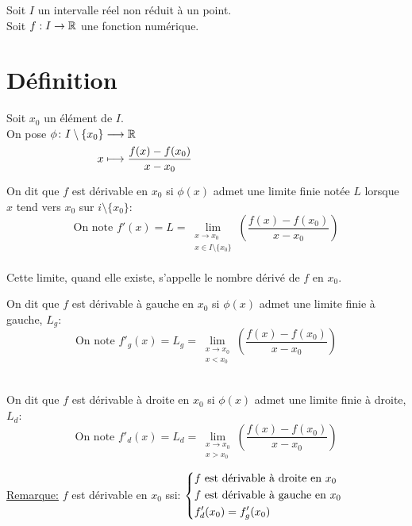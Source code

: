 \documentclass[12pt,twoside,a4paper]{article}
\author{MPSI 2}
\begin{document}
	\maketitle
	\begin{flushleft}
		Soit $I$ un intervalle r\'eel non r\'eduit \`a un point.\\
		Soit $f:I\rightarrow\mathbb{R}$ une fonction num\'erique.
	\end{flushleft}
	\section{D\'efinition}
		\begin{flushleft}
			Soit $x_0$ un \'el\'ement de $I$.\\
			On pose $\begin{aligned}[t]\phi\colon I\setminus\{x_0\}&\longrightarrow\mathbb{R} \\x&\longmapsto\frac{f(x)-f(x_0)}{x-x_0}\end{aligned}$
		\end{flushleft}
		\begin{defi}
			\begin{liste}
				\item On dit que $f$ est d\'erivable en $x_0$ si $\phi(x)$ admet une limite finie not\'ee $L$ lorsque $x$ tend vers $x_0$ sur $i\setminus\{x_0\}$:\\
					$$\text{On note }f'(x)=L=\lim\limits_{\substack{x\rightarrow x_0 \\x\in I\setminus\{x_0\}}}\!\!\left(\frac{f(x)-f(x_0)}{x-x_0} \right) $$\\
					Cette limite, quand elle existe, s'appelle le nombre d\'eriv\'e de $f$ en $x_0$.\\
				\item On dit que $f$ est d\'erivable \`a gauche en $x_0$ si $\phi(x)$ admet une limite finie \`a gauche, $L_g$:\\
					$$\text{On note }f'_g(x)=L_g=\lim\limits_{\substack{x\rightarrow x_0 \\x<x_0}}\!\!\left(\frac{f(x)-f(x_0)}{x-x_0} \right) $$\\
				\item On dit que $f$ est d\'erivable \`a droite en $x_0$ si $\phi(x)$ admet une limite finie \`a droite, $L_d$:\\
					$$\text{On note }f'_d(x)=L_d=\lim\limits_{\substack{x\rightarrow x_0 \\x>x_0}}\!\!\left(\frac{f(x)-f(x_0)}{x-x_0} \right) $$
			\end{liste}
		\end{defi}
		\begin{flushleft}
			\underline{Remarque:} $f$ est d\'erivable en $x_0$ ssi: $\left\{\begin{aligned}& f\text{ est d\'erivable \`a droite en }x_0\\& f\text{ est d\'erivable \`a gauche en }x_0\\& f'_d(x_0)=f'_g(x_0)\end{aligned}\right.$
		\end{flushleft}
\end{document}
